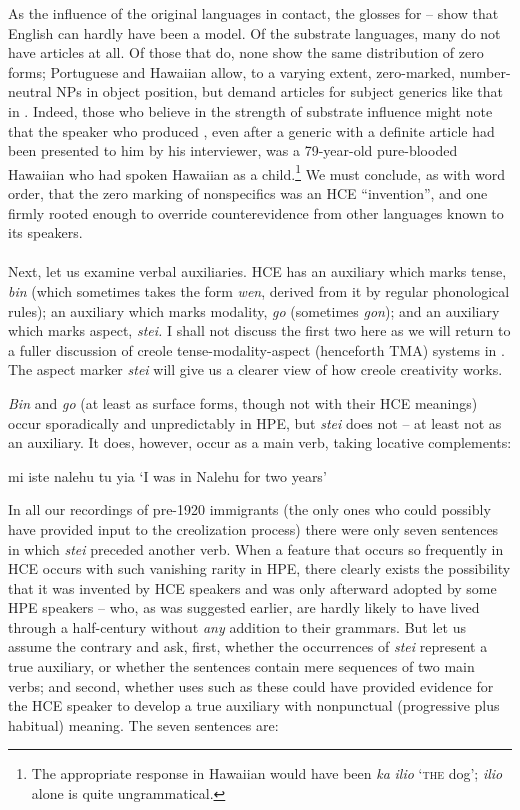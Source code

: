 As the influence of the original languages in contact, the glosses for -- show that English can hardly have been a model. Of the substrate languages, many do not have articles at all. Of those that do, none show the same distribution of zero forms; Portuguese and Hawaiian allow, to a varying extent, zero-marked, number-neutral NPs in object position, but demand articles for subject generics like that in . Indeed, those who believe in the strength of substrate
influence might note that the speaker who produced , even after a generic with a definite article had been presented to him by his inter\-viewer, was a 79-year-old pure-blooded Hawaiian who had spoken Hawaiian as a child.\footnote{The appropriate response in Hawaiian would have been \textit{ka} \textit{ilio} `\textsc{the} dog'; \textit{ilio} alone is quite ungrammatical.} We must conclude, as with word order, that the zero marking of nonspecifics was an HCE ``invention'', and one firmly rooted enough to override counterevidence from other languages known to its speakers.\\\\

Next, let us examine verbal auxiliaries. HCE has an auxiliary which marks tense, \textit{bin} (which sometimes takes the form \textit{wen}, derived from it by regular phonological rules); an auxiliary which marks modality, \textit{go} (sometimes \textit{gon}); and an auxiliary which marks aspect, \textit{stei.} I shall not discuss the first two here as we will return to a fuller discus\-sion of creole tense-modality-aspect (henceforth TMA) systems in . The aspect marker \textit{stei} will give us a clearer view of how creole creativity works.

\textit{Bin} and \textit{go} (at least as surface forms, though not with their HCE meanings) occur sporadically and unpredictably in HPE, but \textit{stei} does not -- at least not as an auxiliary. It does, however, occur as a main verb, taking locative complements:

\ea\label{ex:44}
 mi iste nalehu tu yia
\glt `I was in Nalehu for two years'
\z

\noindent In all our recordings of pre-1920 immigrants (the only ones who could possibly have provided input to the creolization process) there were only seven sentences in which \textit{stei} preceded another verb. When a feature that occurs so frequently in HCE occurs with such vanishing rarity in HPE, there clearly exists the possibility that it was invented by HCE speakers and was only afterward adopted by some HPE speakers -- who, as was suggested earlier, are hardly likely to have lived through a half-century without \textit{any} addition to their grammars. But let us assume the contrary and ask, first, whether the occurrences of \textit{stei} represent
% 
a true auxiliary, or whether the sentences contain mere sequences of two main verbs; and second, whether uses such as these could have provided evidence for the HCE speaker to develop a true auxiliary with nonpunctual (progressive plus habitual) meaning. The seven sentences are:


